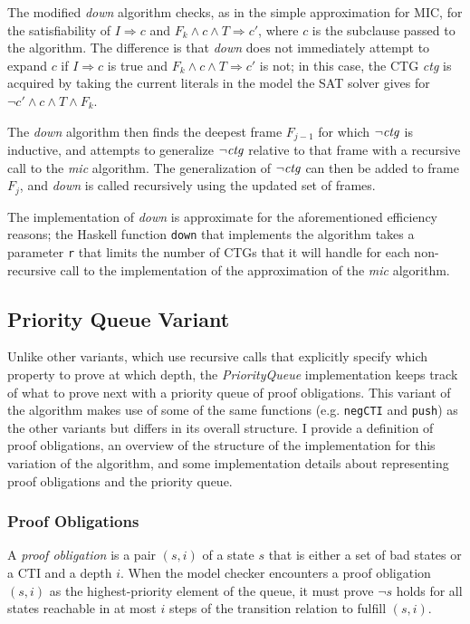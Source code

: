 \documentclass[12pt,a4paper,twoside,openright]{report}
\begin{document}
{The modified {\it down} algorithm checks, as in the simple approximation for MIC, for the satisfiability of
$I \Rightarrow c$ and $F_k \wedge c \wedge T \Rightarrow c'$, where $c$ is the subclause passed to
the algorithm.
The difference is that {\it down} does not immediately attempt to expand $c$
if $I \Rightarrow c$ is true and $F_k \wedge c \wedge T \Rightarrow c'$ is
not; in this case, the CTG {\it ctg} is acquired by taking the current literals in
the model the SAT solver gives for $\neg c' \wedge c \wedge T \wedge F_k$.

The {\it down} algorithm then finds the deepest frame $F_{j - 1}$ for which $\neg {\it ctg}$ is inductive,
and attempts to generalize $\neg {\it ctg}$ relative to that frame with a recursive call to the
{\it mic} algorithm. The generalization of $\neg {\it ctg}$ can then be added to frame $F_j$,
and {\it down} is called recursively using the updated set of frames.

The implementation of {\it down} is approximate for the aforementioned efficiency
reasons; the Haskell function \verb,down, that implements
the algorithm takes a parameter \verb,r, that limits the number of CTGs that it will handle for
each non-recursive call to the implementation of the approximation of the {\it mic} algorithm.

\subsection{Priority Queue Variant}
\label{pqueue}
Unlike other variants, which use recursive calls that explicitly specify which property
to prove at which depth, the \emph{PriorityQueue} implementation keeps track of what
to prove next with a priority queue of proof obligations.
This variant of the algorithm makes
use of some of the same functions (e.g. \verb,negCTI, and \verb,push,) as the other variants but
differs in its overall structure.
I provide a definition of proof obligations, an
overview of the structure of the implementation for this variation of the algorithm,
and some implementation details about representing proof obligations and the priority queue.

\subsubsection{Proof Obligations}
A \emph{proof obligation} is a pair $(s,i)$ of a state $s$ that is either a set of bad states
or a CTI and a depth $i$. When the model checker encounters a proof obligation
$(s,i)$ as the highest-priority element of the queue, it must prove $\neg s$ holds for all states
reachable in at most $i$ steps of the transition relation to fulfill
$(s, i)$.

}
\end{document}

